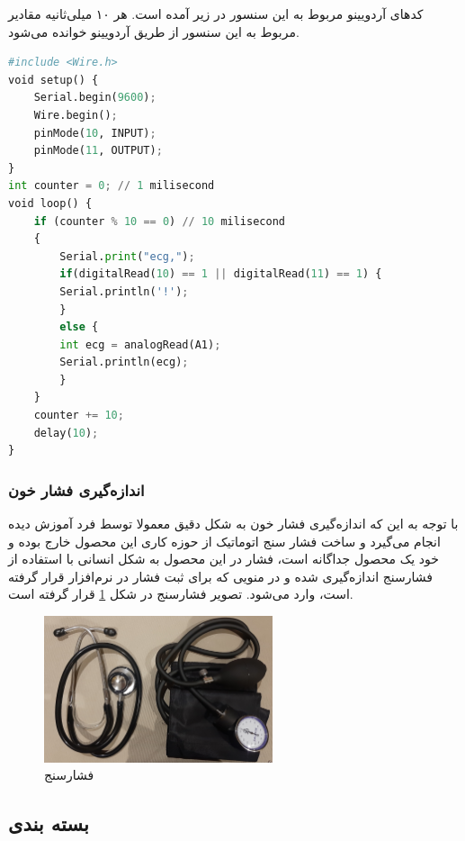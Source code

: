 کدهای آردویینو مربوط به این سنسور در زیر آمده است. هر ۱۰ میلی‌ثانیه مقادیر مربوط به این سنسور از طریق آردویینو خوانده می‌شود.

\begin{latin}
	\begin{lstlisting}[language=python]
#include <Wire.h>
void setup() {
	Serial.begin(9600);
	Wire.begin();
	pinMode(10, INPUT);
	pinMode(11, OUTPUT);
}
int counter = 0; // 1 milisecond
void loop() {
	if (counter % 10 == 0) // 10 milisecond
	{
		Serial.print("ecg,");
		if(digitalRead(10) == 1 || digitalRead(11) == 1) {
		Serial.println('!');
		}
		else {
		int ecg = analogRead(A1);
		Serial.println(ecg);
		}  
	}
	counter += 10;
	delay(10);
}

	\end{lstlisting}
\end{latin}





\subsubsection{انداز‌ه‌گیری فشار خون }

با توجه به این که اندازه‌گیری فشار خون به شکل دقیق معمولا توسط فرد آموزش دیده انجام می‌گیرد و ساخت فشار سنج اتوماتیک از حوزه کاری این محصول خارج بوده و خود یک محصول جداگانه است، فشار در این محصول به شکل انسانی با استفاده از فشارسنج اندازه‌گیری شده و در منویی که برای ثبت فشار در نرم‌افزار قرار گرفته است، وارد می‌شود. تصویر فشارسنج در شکل \ref{fig:12} قرار گرفته است.



\begin{figure}[h]
	\centering
	\includegraphics[width=0.6\textwidth]{figs/cuff.jpg}
	
	\caption{فشارسنج}
	\label{fig:12}
\end{figure}




\subsection{بسته بندی}

